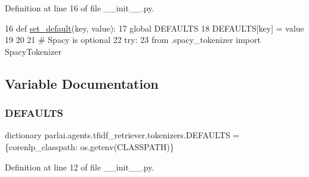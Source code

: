Definition at line 16 of file \+\_\+\+\_\+init\+\_\+\+\_\+.\+py.


\begin{DoxyCode}
16 \textcolor{keyword}{def }\hyperlink{namespaceparlai_1_1agents_1_1tfidf__retriever_1_1tokenizers_aac1e43e3c08d0ea6279619797a56ba16}{set\_default}(key, value):
17     \textcolor{keyword}{global} DEFAULTS
18     DEFAULTS[key] = value
19 
20 
21 \textcolor{comment}{# Spacy is optional}
22 \textcolor{keywordflow}{try}:
23     \textcolor{keyword}{from} .spacy\_tokenizer \textcolor{keyword}{import} SpacyTokenizer
\end{DoxyCode}


\subsection{Variable Documentation}
\mbox{\label{namespaceparlai_1_1agents_1_1tfidf__retriever_1_1tokenizers_aceb8da08449faf55b676b50a2c09a291}} 
\subsubsection{\texorpdfstring{D\+E\+F\+A\+U\+L\+TS}{DEFAULTS}}
{\footnotesize\ttfamily dictionary parlai.\+agents.\+tfidf\+\_\+retriever.\+tokenizers.\+D\+E\+F\+A\+U\+L\+TS = \{\textquotesingle{}corenlp\+\_\+classpath\textquotesingle{}\+: os.\+getenv(\textquotesingle{}C\+L\+A\+S\+S\+P\+A\+TH\textquotesingle{})\}}



Definition at line 12 of file \+\_\+\+\_\+init\+\_\+\+\_\+.\+py.

